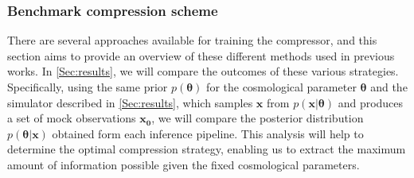 \documentclass{aa}
\begin{document}
\subsubsection{Benchmark compression scheme}
There are several approaches available for training the compressor, and this section aims to provide an overview of these different methods used in previous works. 
In \autoref{Sec:results}, we will compare the outcomes of these various strategies. Specifically, using the same prior $p(\bm {\theta})$ for the cosmological parameter $\bm{\theta}$ and the simulator described in \autoref{Sec:results}, which samples $\bm {x}$ from $p(\bm{x}| \bm{\theta})$ and produces a set of mock observations $\bm{x_0}$, we will compare the posterior distribution $p(\bm{\theta}|\bm{x})$ obtained form each inference pipeline. This analysis will help to determine the optimal compression strategy, enabling us to extract the maximum amount of information possible given the fixed cosmological parameters.
\end{document}
